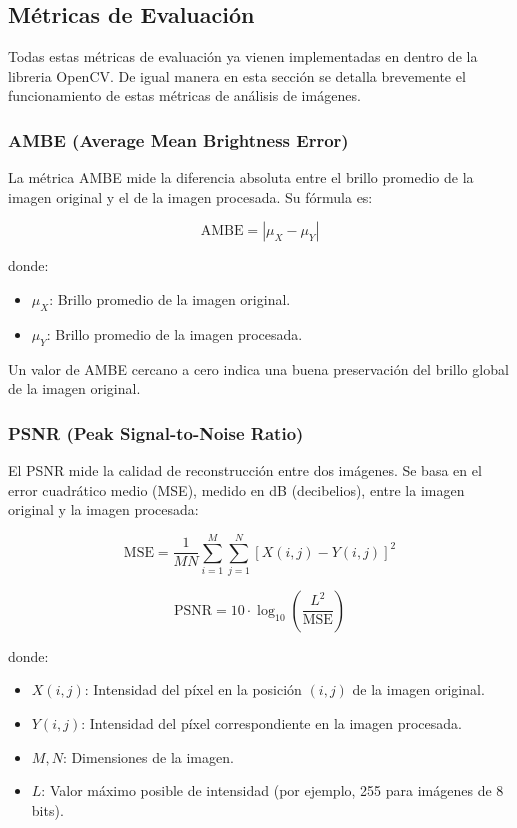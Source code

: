 \documentclass[sigchi]{acmart}
\begin{document}
\subsection{Métricas de Evaluación}

Todas estas métricas de evaluación ya vienen implementadas en dentro de la libreria OpenCV. De igual manera
en esta sección se detalla brevemente el funcionamiento de estas métricas de análisis de imágenes.

\subsubsection{\textbf{AMBE (Average Mean Brightness Error)}}
La métrica AMBE mide la diferencia absoluta entre el brillo promedio de la imagen original y el
de la imagen procesada. Su fórmula es:

\begin{equation}
	\text{AMBE} = \left| \mu_X - \mu_Y \right|
\end{equation}

donde:
\begin{itemize}
	\item $\mu_X$: Brillo promedio de la imagen original.
	\item $\mu_Y$: Brillo promedio de la imagen procesada.
\end{itemize}

Un valor de AMBE cercano a cero indica una buena preservación del brillo global de la imagen original.

\subsubsection{\textbf{PSNR (Peak Signal-to-Noise Ratio)}}
El PSNR mide la calidad de reconstrucción entre dos imágenes. Se basa en el error cuadrático
medio (MSE), medido en dB (decibelios), entre la imagen original y la imagen procesada:

\begin{equation}
	\text{MSE} = \frac{1}{MN} \sum_{i=1}^{M} \sum_{j=1}^{N} \left[ X(i,j) - Y(i,j) \right]^2
\end{equation}

\begin{equation}
	\text{PSNR} = 10 \cdot \log_{10} \left( \frac{L^2}{\text{MSE}} \right)
\end{equation}

donde:
\begin{itemize}
	\item $X(i,j)$: Intensidad del píxel en la posición $(i,j)$ de la imagen original.
	\item $Y(i,j)$: Intensidad del píxel correspondiente en la imagen procesada.
	\item $M, N$: Dimensiones de la imagen.
	\item $L$: Valor máximo posible de intensidad (por ejemplo, 255 para imágenes de 8 bits).
\end{itemize}
\end{document}
